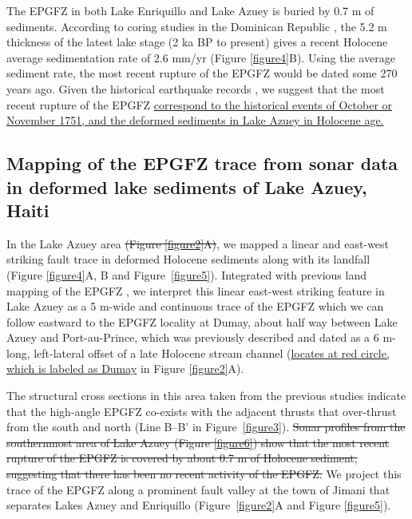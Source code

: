 \documentclass[linenumbers,draft]{agujournal}
\begin{document}
The EPGFZ in both Lake Enriquillo and Lake Azuey is buried by 0.7 m of sediments. According to coring studies in the Dominican Republic \citep{taylor1985stratigraphy,rios2013holocene}, the 5.2 m thickness of the latest lake stage (2 ka BP to present) gives a recent Holocene average sedimentation rate of 2.6 mm/yr (Figure \ref{figure4}B). Using the average sediment rate, the most recent rupture of the EPGFZ would be dated some 270 years ago. Given the historical earthquake records \citep{bakun2012significant}, we suggest that the most recent rupture of the EPGFZ \ul{correspond to the historical events of October or November 1751, and the deformed sediments in Lake Azuey in Holocene age.}

\subsection{Mapping of the EPGFZ trace from sonar data in deformed lake sediments of Lake Azuey, Haiti}
In the Lake Azuey area \st{(Figure {\ref{figure2}}A)}, we mapped a linear and east-west striking fault trace in deformed Holocene sediments along with its landfall (Figure \ref{figure4}A, B and Figure~\ref{figure5}). Integrated with previous land mapping of the EPGFZ \citep{bourgueil1988synthese,mann1995actively,prentice2010seismic,cowgill2012interactive}, we interpret this linear east-west striking feature in Lake Azuey as a 5 m-wide and continuous trace of the EPGFZ which we can follow eastward to the EPGFZ locality at Dumay, about half way between Lake Azuey and Port-au-Prince, which was previously described and dated as a 6 m-long, left-lateral offset of a late Holocene stream channel \citep{cowgill2012interactive} (\ul{locates at red circle, which is labeled as Dumay} in Figure \ref{figure2}A). 

The structural cross sections in this area taken from the previous studies \citep{massoni1955haiti,mann1995actively,douilly2015three} indicate that the high-angle EPGFZ co-exists with the adjacent thrusts that over-thrust from the south and north (Line B--B' in Figure~\ref{figure3}). \st{Sonar profiles from the southernmost area of Lake Azuey (Figure {\ref{figure6}}) show that the most recent rupture of the EPGFZ is covered by about 0.7 m of Holocene sediment, suggesting that there has been no recent activity of the EPGFZ.} We project this trace of the EPGFZ along a prominent fault valley at the town of Jimani that separates Lakes Azuey and Enriquillo (Figure~\ref{figure2}A and Figure \ref{figure5}).
\end{document}

